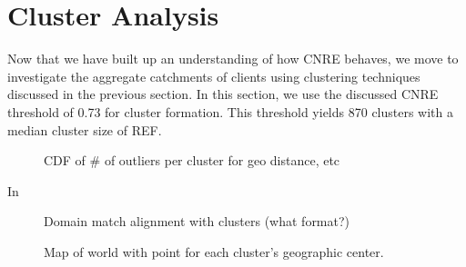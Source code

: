 \section{Cluster Analysis} \label{sect:analysis}

Now that we have built up an understanding of how CNRE behaves, we move to
investigate the aggregate catchments of clients using clustering techniques
discussed in the previous section. In this section, we use the discussed
CNRE threshold of 0.73 for cluster formation. This threshold yields 870 clusters
with a median cluster size of REF.

\begin{figure}
    \caption{CDF of \# of outliers per cluster for geo distance, etc}
\end{figure}

In 

\begin{figure}
    \caption{Domain match alignment with clusters (what format?)}
\end{figure}

\begin{figure}
    \caption{Map of world with point for each cluster's geographic center.}
\end{figure}

